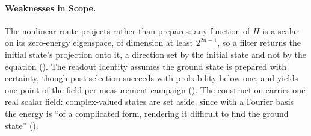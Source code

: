 \paragraph{Weaknesses in Scope.} The nonlinear route projects rather than prepares: any function of $H$ is a scalar on its zero-energy eigenspace, of dimension at least $2^{2n-1}$, so a filter returns the initial state's projection onto it, a direction set by the initial state and not by the equation (). The readout identity assumes the ground state is prepared with certainty, though post-selection succeeds with probability below one, and yields one point of the field per measurement campaign (). The construction carries one real scalar field: complex-valued states are set aside, since with a Fourier basis the energy is ``of a complicated form, rendering it difficult to find the ground state'' \cite{wu2025pihm} ().

